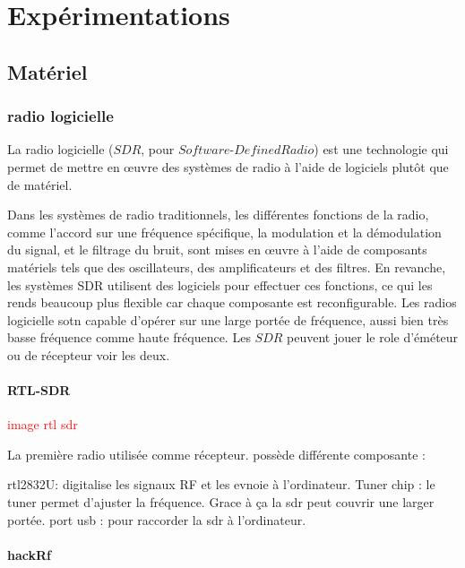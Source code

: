 \chapter{Expérimentations}


\renewcommand{\leftmark}{EXPERIMENTATIONS}

\section{Matériel}

\subsection{radio logicielle}

La radio logicielle ($SDR$, pour $Software$-$Defined Radio$) est une technologie qui permet de mettre en œuvre des systèmes de radio à l'aide de logiciels plutôt que de matériel. 

Dans les systèmes de radio traditionnels, les différentes fonctions de la radio, comme l'accord sur une fréquence spécifique, la modulation et la démodulation du signal, et le filtrage du bruit, sont mises en œuvre à l'aide de composants matériels tels que des oscillateurs, des amplificateurs et des filtres. En revanche, les systèmes SDR utilisent des logiciels pour effectuer ces fonctions, ce qui les rends beaucoup plus flexible car chaque composante est reconfigurable. Les radios logicielle sotn capable d'opérer sur une large portée de fréquence, aussi bien très basse fréquence comme haute fréquence.
Les $SDR$ peuvent jouer le role d'éméteur ou de récepteur voir les deux.

\subsubsection{RTL-SDR}

\textcolor{red}{image rtl sdr}

La première radio utilisée comme récepteur. possède différente composante :

rtl2832U: digitalise les signaux RF et les evnoie à l'ordinateur.
Tuner chip : le tuner permet d'ajuster la fréquence. Grace à ça la sdr peut couvrir une larger portée.
port usb : pour raccorder la sdr à l'ordinateur.

\subsubsection{hackRf}

